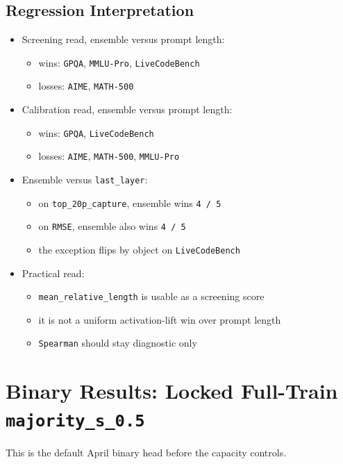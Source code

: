 \documentclass[11pt]{article}
\begin{document}
\subsection*{Regression Interpretation}
\begin{itemize}[leftmargin=1.5em]
\item Screening read, ensemble versus prompt length:
  \begin{itemize}[leftmargin=1.5em]
  \item wins: \texttt{GPQA}, \texttt{MMLU-Pro}, \texttt{LiveCodeBench}
  \item losses: \texttt{AIME}, \texttt{MATH-500}
  \end{itemize}
\item Calibration read, ensemble versus prompt length:
  \begin{itemize}[leftmargin=1.5em]
  \item wins: \texttt{GPQA}, \texttt{LiveCodeBench}
  \item losses: \texttt{AIME}, \texttt{MATH-500}, \texttt{MMLU-Pro}
  \end{itemize}
\item Ensemble versus \texttt{last\_layer}:
  \begin{itemize}[leftmargin=1.5em]
  \item on \texttt{top\_20p\_capture}, ensemble wins \texttt{4 / 5}
  \item on \texttt{RMSE}, ensemble also wins \texttt{4 / 5}
  \item the exception flips by object on \texttt{LiveCodeBench}
  \end{itemize}
\item Practical read:
  \begin{itemize}[leftmargin=1.5em]
  \item \texttt{mean\_relative\_length} is usable as a screening score
  \item it is not a uniform activation-lift win over prompt length
  \item \texttt{Spearman} should stay diagnostic only
  \end{itemize}
\end{itemize}

\section*{Binary Results: Locked Full-Train \texttt{majority\_s\_0.5}}
This is the default April binary head before the capacity controls.
\end{document}
